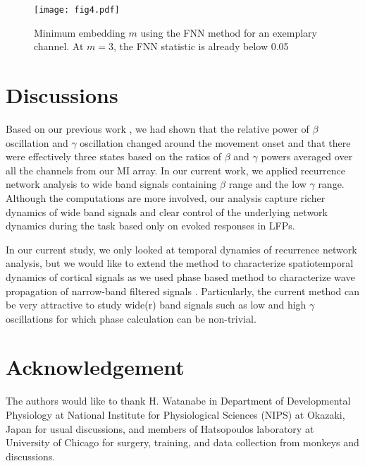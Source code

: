 \documentclass[letterpaper, 9pt, conference]{ieeeconf}
\begin{document}
\begin{figure}[ht!]
                             \texttt{[image: fig4.pdf]}
                             \caption{\label{fig:min_emb} Minimum embedding $m$ using the FNN method for an exemplary channel. At $m=3$, the FNN statistic is already below 0.05}
\end{figure}


\section{Discussions}
\label{sec:discussions}
Based on our previous work \cite{MattNER2013}, we had shown that the relative power of $\beta$ oscillation and $\gamma$ oscillation changed around the movement onset and that there were effectively three states based on the ratios of $\beta$ and $\gamma$ powers averaged over all the channels from our MI array. In our current work, we applied recurrence network analysis to wide band signals containing $\beta$ range and the low $\gamma$ range. Although the computations are more involved, our analysis capture richer
 dynamics of  wide band signals and clear control of the underlying network dynamics during the task
 based only on evoked responses in LFPs. 

 In our current study, we only looked at temporal dynamics of recurrence network analysis,  but we would like to extend the method to characterize spatiotemporal dynamics of cortical signals as we used phase based method to characterize wave propagation of narrow-band filtered signals \cite{doug2006betawave}. Particularly, the current method can be very attractive to study wide(r) band signals such as low and high $\gamma$ oscillations for which phase calculation can be non-trivial. 







\section{Acknowledgement}
The authors would like to thank H. Watanabe in Department of Developmental Physiology at National Institute for Physiological Sciences (NIPS) at Okazaki, Japan for usual discussions,  and members of Hatsopoulos laboratory at University of Chicago for surgery,  training, and data collection from monkeys and discussions. 



\end{document}

